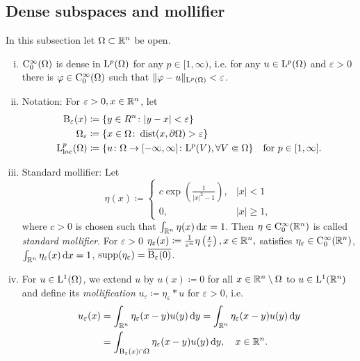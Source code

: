 \subsection{Dense subspaces and mollifier}

In this subsection let $\Omega \subset \mathbb{R}^n$ be open.
\begin{enumerate}[i)]
  \item $\mathrm{C}_0^\infty(\Omega)$ is dense in $\mathrm{L}^p(\Omega)$ for any $p \in [1,\infty)$, i.e. for any $u \in \mathrm{L}^p(\Omega)$ and $\varepsilon > 0$ there is $\varphi \in \mathrm{C}_0^\infty(\Omega)$ such that $\|\varphi - u\|_{\mathrm{L}^p(\Omega)} < \varepsilon$.
    \item Notation: For $\varepsilon > 0, x \in \mathbb{R}^n$, let 
      \begin{align*}
        \mathrm{B}_\varepsilon(x) &\coloneqq \{ y \in R^n \colon |y - x| < \varepsilon \} \\
        \Omega_\varepsilon &\coloneqq \{ x \in \Omega \colon \operatorname{dist}(x, \partial\Omega) > \varepsilon \} \\
        \mathrm{L}_{\operatorname{loc}}^p(\Omega) &\coloneqq \{ u \colon \Omega \to [-\infty, \infty] \colon \mathrm{L}^p(V), \forall V \Subset \Omega \} \quad\text{for $p \in [1,\infty]$.}
    \end{align*}
  \item Standard mollifier: Let
    $$
    \eta(x) \coloneqq \begin{cases} c \exp\left( \frac{1}{|x|^2 - 1} \right), &|x| < 1 \\ 0, &|x| \geq 1, \end{cases}
    $$
    where $c > 0$ is chosen such that $\int_{\mathbb{R}^n} \eta(x) \, {\operatorname{d}\!{x}} = 1$.
    Then $\eta \in \mathrm{C}_0^\infty(\mathbb{R}^n)$ is called \emph{standard mollifier}.
    For $\varepsilon > 0$
    $
    \eta_\varepsilon(x) \coloneqq \frac{1}{\varepsilon^n} \eta \left(\frac{x}{\varepsilon} \right), x \in \mathbb{R}^n,
    $
    satisfies $\eta_\varepsilon \in \mathrm{C}_0^\infty(\mathbb{R}^n)$, $\int_{\mathbb{R}^n} \eta_\varepsilon(x) \, {\operatorname{d}\!{x}} = 1$, $\operatorname{supp}(\eta_\varepsilon) = \overline{\mathrm{B}_\varepsilon(0)}$.
  \item For $u \in \mathrm{L}^1(\Omega)$, we extend $u$ by $u(x) \coloneqq 0$ for all $x \in \mathbb{R}^n \setminus \Omega$ to $u \in \mathrm{L}^1(\mathbb{R}^n)$ and define its \emph{mollification} $u_\varepsilon \coloneqq \eta_\varepsilon \ast u$ for $\varepsilon > 0$, i.e.
  \begin{align*}
    u_\varepsilon(x) 
    &= \int_{\R^n} \eta_\varepsilon(x - y) u(y) \d y
    = \int_{\R^n} \eta_\varepsilon(x - y) u(y) \d y \\
    &= \int_{\BB_\varepsilon(x) \cap \Omega} \eta_\varepsilon(x - y) u(y) \d y, \quad x \in \R^n.

\end{align*}
\end{enumerate}
